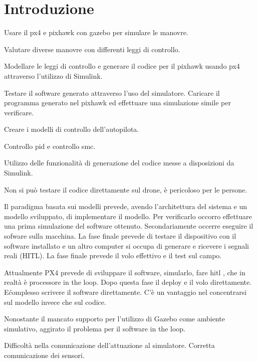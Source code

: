 \chapter{Introduzione}
\begin{idee}

	Usare il px4 e pixhawk con gazebo per simulare le manovre.
	
	Valutare diverse manovre con differenti leggi di controllo.
	
	Modellare le leggi di controllo e generare il codice per il pixhawk usando px4 attraverso l'utilizzo di Simulink.
	
	Testare il software generato attraverso l'uso del simulatore. Caricare il programma generato nel pixhawk ed effettuare una simulazione simile per verificare.
	
	Creare i modelli di controllo dell'autopilota.
	
	Controllo pid e controllo smc.
	
	Utilizzo delle funzionalità di generazione del codice messe a disposizioni da Simulink.
		
	Non si può testare il codice direttamente sul drone, è pericoloso per le persone.	
	
	Il paradigma basata sui modelli prevede, avendo l'architettura del sistema e un modello sviluppato, di implementare il modello. Per verificarlo occorro effettuare una prima simulazione del software ottenuto. Secondariamente occerre eseguire il sofware sulla macchina. La fase finale prevede di testare il dispositivo con il  software installato e un altro computer si occupa di generare e ricevere i segnali reali (HITL). La fase finale prevede il volo effettivo e il test sul campo.
	
	Attualmente PX4 prevede di sviluppare il software, simularlo, fare hitl , che in realtà è processore in the loop. Dopo questa fase il deploy e il volo direttamente. E\' complesso scrivere il software direttamente. C'è un vantaggio nel concentrarsi sul modello invece che sul codice.
	
	Nonostante il mancato supporto per l'utilizzo di Gazebo come ambiente simulativo, aggirato il problema per il software in the loop.
	
	Difficoltà nella comunicazione dell'attuazione al simulatore. Corretta comunicazione dei sensori.
\end{idee}

